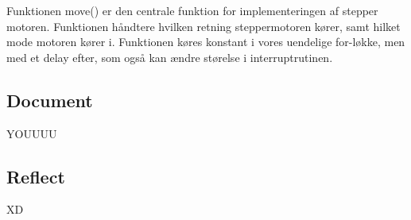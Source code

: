 \documentclass[../main.tex]{subfiles}
\begin{document}


Funktionen move() er den centrale funktion for implementeringen af stepper motoren. Funktionen håndtere hvilken retning steppermotoren kører, samt hilket mode motoren kører i. Funktionen køres konstant i vores uendelige for-løkke, men med et delay efter, som også kan ændre størelse i interruptrutinen.



\subsection{Document}
YOUUUU

\subsection{Reflect}
XD
\end{document}
